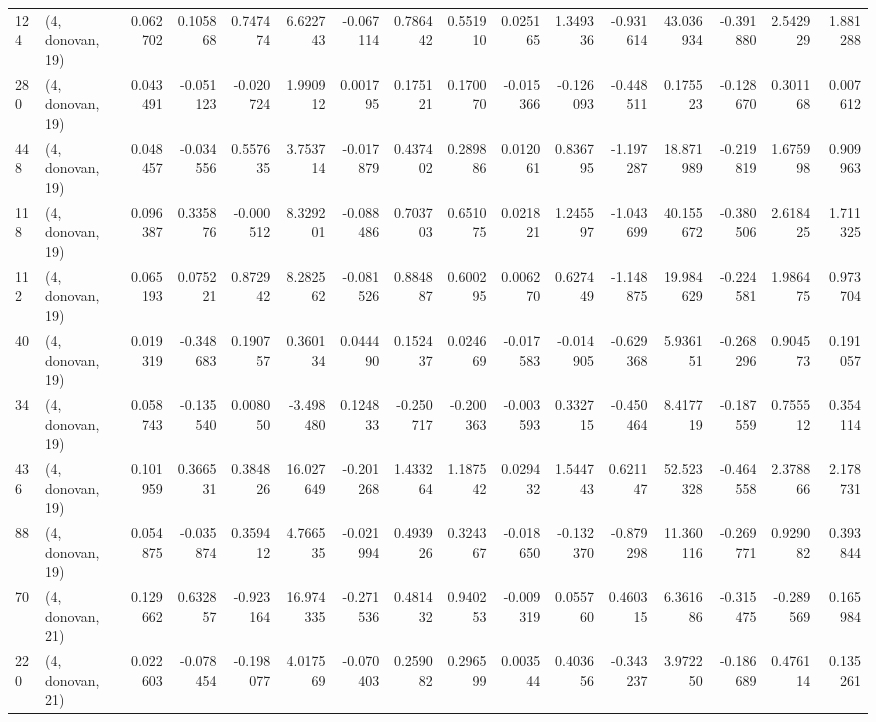 \begin{tabular}{llrrrrrrrrrrrrrr}
124 &  (4, donovan, 19) &   0.062702 &  0.105868 &  0.747474 &    6.622743 & -0.067114 &   0.786442 &  0.551910 &  0.025165 &  1.349336 & -0.931614 &   43.036934 & -0.391880 &  2.542929 &  1.881288 \\
280 &  (4, donovan, 19) &   0.043491 & -0.051123 & -0.020724 &    1.990912 &  0.001795 &   0.175121 &  0.170070 & -0.015366 & -0.126093 & -0.448511 &    0.175523 & -0.128670 &  0.301168 &  0.007612 \\
448 &  (4, donovan, 19) &   0.048457 & -0.034556 &  0.557635 &    3.753714 & -0.017879 &   0.437402 &  0.289886 &  0.012061 &  0.836795 & -1.197287 &   18.871989 & -0.219819 &  1.675998 &  0.909963 \\
118 &  (4, donovan, 19) &   0.096387 &  0.335876 & -0.000512 &    8.329201 & -0.088486 &   0.703703 &  0.651075 &  0.021821 &  1.245597 & -1.043699 &   40.155672 & -0.380506 &  2.618425 &  1.711325 \\
112 &  (4, donovan, 19) &   0.065193 &  0.075221 &  0.872942 &    8.282562 & -0.081526 &   0.884887 &  0.600295 &  0.006270 &  0.627449 & -1.148875 &   19.984629 & -0.224581 &  1.986475 &  0.973704 \\
40  &  (4, donovan, 19) &   0.019319 & -0.348683 &  0.190757 &    0.360134 &  0.044490 &   0.152437 &  0.024669 & -0.017583 & -0.014905 & -0.629368 &    5.936151 & -0.268296 &  0.904573 &  0.191057 \\
34  &  (4, donovan, 19) &   0.058743 & -0.135540 &  0.008050 &   -3.498480 &  0.124833 &  -0.250717 & -0.200363 & -0.003593 &  0.332715 & -0.450464 &    8.417719 & -0.187559 &  0.755512 &  0.354114 \\
436 &  (4, donovan, 19) &   0.101959 &  0.366531 &  0.384826 &   16.027649 & -0.201268 &   1.433264 &  1.187542 &  0.029432 &  1.544743 &  0.621147 &   52.523328 & -0.464558 &  2.378866 &  2.178731 \\
88  &  (4, donovan, 19) &   0.054875 & -0.035874 &  0.359412 &    4.766535 & -0.021994 &   0.493926 &  0.324367 & -0.018650 & -0.132370 & -0.879298 &   11.360116 & -0.269771 &  0.929082 &  0.393844 \\
70  &  (4, donovan, 21) &   0.129662 &  0.632857 & -0.923164 &   16.974335 & -0.271536 &   0.481432 &  0.940253 & -0.009319 &  0.055760 &  0.460315 &    6.361686 & -0.315475 & -0.289569 &  0.165984 \\
220 &  (4, donovan, 21) &   0.022603 & -0.078454 & -0.198077 &    4.017569 & -0.070403 &   0.259082 &  0.296599 &  0.003544 &  0.403656 & -0.343237 &    3.972250 & -0.186689 &  0.476114 &  0.135261 \\

\end{tabular}
